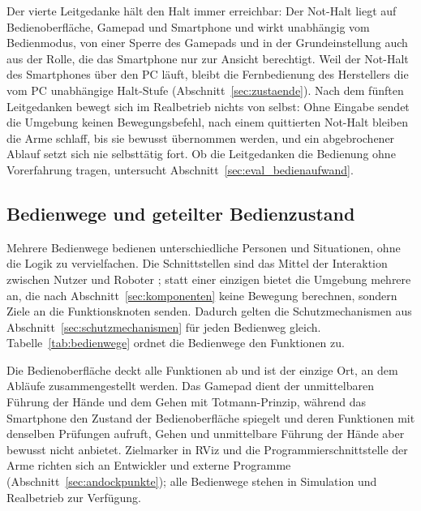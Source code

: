 Der vierte Leitgedanke hält den Halt immer erreichbar: Der Not-Halt liegt auf Bedienoberfläche, Gamepad und
Smartphone und wirkt unabhängig vom Bedienmodus, von einer Sperre des Gamepads und in der Grundeinstellung auch aus
der Rolle, die das Smartphone nur zur Ansicht berechtigt.
Weil der Not-Halt des Smartphones über den PC läuft, bleibt die Fernbedienung des Herstellers die vom PC
unabhängige Halt-Stufe (Abschnitt~\ref{sec:zustaende}).
Nach dem fünften Leitgedanken bewegt sich im Realbetrieb nichts von selbst: Ohne Eingabe sendet die Umgebung keinen
Bewegungsbefehl, nach einem quittierten Not-Halt bleiben die Arme schlaff, bis sie bewusst übernommen werden, und
ein abgebrochener Ablauf setzt sich nie selbsttätig fort.
Ob die Leitgedanken die Bedienung ohne Vorerfahrung tragen, untersucht Abschnitt~\ref{sec:eval_bedienaufwand}.

\subsection{Bedienwege und geteilter Bedienzustand}
\label{sec:bedienwege_konzept}
Mehrere Bedienwege bedienen unterschiedliche Personen und Situationen, ohne die Logik zu vervielfachen.
Die Schnittstellen sind das Mittel der Interaktion zwischen Nutzer und Roboter \cite{Darvish2023};
statt einer einzigen bietet die Umgebung mehrere an, die nach Abschnitt~\ref{sec:komponenten} keine Bewegung
berechnen, sondern Ziele an die Funktionsknoten senden.
Dadurch gelten die Schutzmechanismen aus Abschnitt~\ref{sec:schutzmechanismen} für jeden Bedienweg gleich.
Tabelle~\ref{tab:bedienwege} ordnet die Bedienwege den Funktionen zu.

Die Bedienoberfläche deckt alle Funktionen ab und ist der einzige Ort, an dem Abläufe zusammengestellt werden.
Das Gamepad dient der unmittelbaren Führung der Hände und dem Gehen mit Totmann-Prinzip, während das Smartphone den
Zustand der Bedienoberfläche spiegelt und deren Funktionen mit denselben Prüfungen aufruft, Gehen und unmittelbare
Führung der Hände aber bewusst nicht anbietet.
Zielmarker in RViz und die Programmierschnittstelle der Arme richten sich an Entwickler und externe Programme
(Abschnitt~\ref{sec:andockpunkte}); alle Bedienwege stehen in Simulation und Realbetrieb zur Verfügung.

